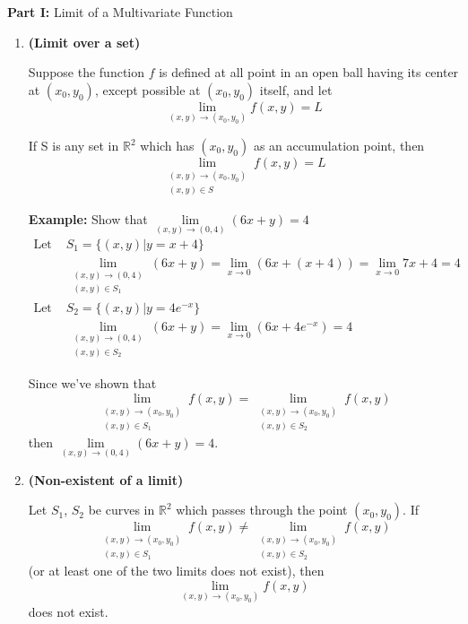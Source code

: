 \documentclass{article}
\begin{document}

\noindent \textbf{Part I:} Limit of a Multivariate Function 
\vspace{-0.5em}
\begin{enumerate}[start=1, label={\bfseries Theorem \arabic*:}, wide=0pt] %
    \item \textbf{(Limit over a set)}
    \vspace{-0.2em}

    Suppose the function $f$ is defined at all point in an open ball having its center at $(x_0,y_0)$, except possible at $(x_0,y_0)$ itself, and let
    \[\lim_{(x,y)\xrightarrow{}(x_0,y_0)} f(x,y)=L\]

    If S is any set in $\mathbb{R}^2$ which has $(x_0,y_0)$ as an accumulation point, then \[\lim_{\substack{(x,y) \to (x_0,y_0) \\ (x,y) \in S}} f(x,y) = L\] 

\textbf{Example:} Show that $\lim\limits_{(x,y)\to(0,4)} (6x+y)=4$
\begin{align*}
    \text{Let } &S_1= \{(x,y){}\lvert y=x+4\} \\
                    &{} \lim_{\substack{(x,y) \to (0,4) \\ (x,y) \in S_1}} (6x+y) =\lim_{x \xrightarrow{}0}(6x+(x+4))=\lim_{x\xrightarrow{}0}7x+4=4 \\[1.5ex]
    \text{Let } &S_2 = \{(x,y) \lvert y=4e^{-x} \} \\
                   & \lim_{\substack{(x,y) \to (0,4) \\ (x,y) \in S_2}} (6x+y) =\lim_{x \xrightarrow{}0}(6x+4e^{-x})=4
\end{align*}

    Since we've shown that 
    \[\lim_{\substack{(x,y) \to (x_0,y_0) \\ (x,y) \in S_1}} f(x,y) = \lim_{\substack{(x,y) \to (x_0,y_0) \\ (x,y) \in S_2}} f(x,y)\] 
    then $\lim\limits_{(x,y)\to(0,4)} (6x+y)=4$.

    \item \textbf{(Non-existent of a limit)} 
    
    Let $S_1$, $S_2$ be curves in $\mathbb{R}^2$ which passes through the point $(x_0,y_0)$. If 
    \[\lim\limits_{\substack{(x,y) \to (x_0,y_0) \\ (x,y) \in S_1}} f(x,y) \neq \lim\limits_{\substack{(x,y) \to (x_0,y_0) \\ (x,y) \in S_2}}f(x,y)\] (or at least one of the two limits does not exist), then 
    \[\lim\limits_{(x,y)\to (x_0,y_0)} f(x,y)\] does not exist.


\end{enumerate}
\end{document}
